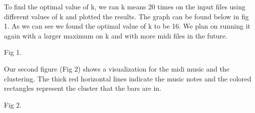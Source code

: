 \documentclass[a4paper, 12pt]{article}
\begin{document}
To find the optimal value of k, we ran k means 20 times on the input files using  
different values of k and plotted the results. The graph can be found below in fig 1. As we can see we found the optimal value of k to be 16. We plan on running it again with a larger maximum on k and with more midi files in the future.

Fig 1.

Our second figure (Fig 2) shows a visualization for the midi music and the clustering. The thick red horizontal lines indicate the music notes and the colored rectangles represent the cluster that the bars are in.

Fig 2.
\end{document}
